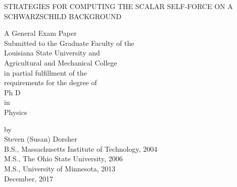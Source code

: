 \documentclass[12pt,letterpaper]{lsuetd}
\begin{document}
\renewcommand\@pnumwidth{1.55em}
\renewcommand\@tocrmarg{9.55em}
\renewcommand*\l@chapter{\@dottedtocline{0}{1.5em}{2.3em}}
\renewcommand*\l@figure{\@dottedtocline{1}{0em}{3.1em}}
\let\l@table\l@figure

\thispagestyle{empty}
\begin{center}
  STRATEGIES FOR COMPUTING THE SCALAR SELF-FORCE ON A SCHWARZSCHILD BACKGROUND

\vfill
\doublespacing
A General Exam Paper \\
\singlespacing
Submitted to the Graduate Faculty of the \\
Louisiana State University and \\
Agricultural and Mechanical College \\
in partial fulfillment of the \\
requirements for the degree of \\
Ph D\\
\doublespacing
in \\
                                       
Physics\\
\singlespacing
\vfill

by \\
Steven (Susan) Dorsher \\
B.S., Massachusetts Institute of Technology, 2004  \\
M.S., The Ohio State University, 2006  \\
M.S., University of Minnesota, 2013  \\
December, 2017
\end{center}
\pagebreak


\end{document}
